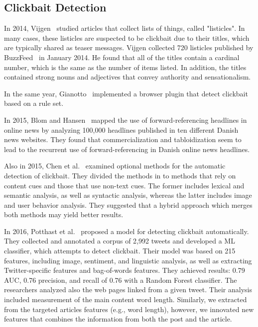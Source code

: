 \documentclass{sig-alternate}
\begin{document}
\subsection{Clickbait Detection}
\label{sec:clickbait_detection}

In 2014, Vijgen~\cite{vijgen2014listicle} studied articles that collect lists of things, called "listicles".
In many cases, these listicles are suspected to be clickbait due to their titles, which are typically shared as teaser messages.
Vijgen collected 720 listicles published by BuzzFeed~\cite{buzzfeed} in January 2014.  
He found that all of the titles contain a cardinal number, which is the same as the number of items listed.
In addition, the titles contained strong nouns and adjectives that convey authority and sensationalism.

In the same year, Gianotto~\cite{gianotto2014downworthy} implemented a browser plugin that detect clickbait based on a rule set.

In 2015, Blom and Hansen~\cite{blom2015click} mapped the use of forward-referencing headlines in online news by analyzing 100,000 headlines published in ten different Danish news websites.
They found that commercialization and tabloidization seem to lead to the recurrent use of forward-referencing in Danish online news headlines.

Also in 2015, Chen et al.~\cite{chen2015misleading} examined optional methods for the automatic detection of clickbait.
They divided the methods in to methods that rely on content cues and those that use non-text cues. 
The former includes lexical and semantic analysis, as well as syntactic analysis, whereas the latter includes image and user behavior analysis. 
They suggested that a hybrid approach which merges both methods may yield better results.  
 
In 2016, Potthast et al.~\cite{potthast2016clickbait} proposed a model for detecting clickbait automatically.
They collected and annotated a corpus of 2,992 tweets and developed a ML classifier, which attempts to detect clickbait. 
Their model was based on 215 features, including image, sentiment, and linguistic analysis, as well as extracting Twitter-specific features and bag-of-words features.
They achieved results: 0.79 AUC, 0.76 precision, and recall of 0.76 with a Random Forest classifier.
The researchers analyzed also the web pages linked from a given tweet. 
Their analysis included measurement of the main content word length.
Similarly, we extracted from the targeted articles features (e.g., word length), however, we innovated new features that combines the information from both the post and the article. 
   
\end{document}
